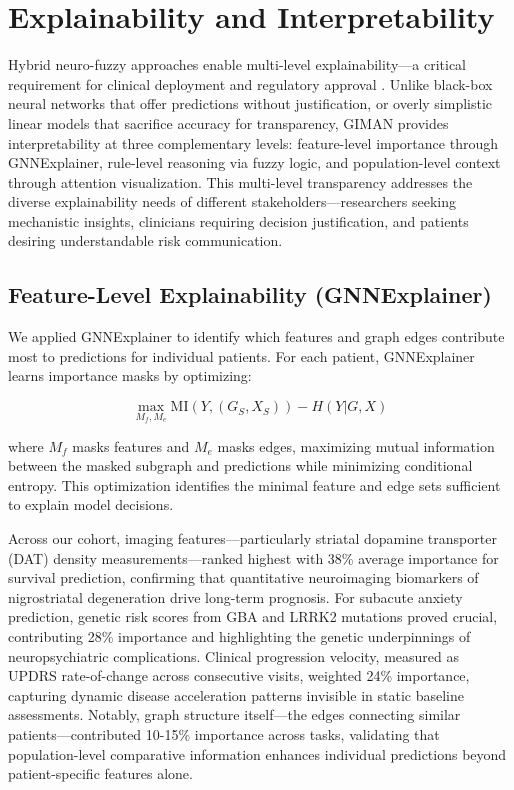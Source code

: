 \documentclass[conference]{IEEEtran}
\begin{document}
\section{Explainability and Interpretability}
\label{sec:explainability}

Hybrid neuro-fuzzy approaches enable multi-level explainability—a critical requirement for clinical deployment and regulatory approval \cite{holzinger2019causability}. Unlike black-box neural networks that offer predictions without justification, or overly simplistic linear models that sacrifice accuracy for transparency, GIMAN provides interpretability at three complementary levels: feature-level importance through GNNExplainer, rule-level reasoning via fuzzy logic, and population-level context through attention visualization. This multi-level transparency addresses the diverse explainability needs of different stakeholders—researchers seeking mechanistic insights, clinicians requiring decision justification, and patients desiring understandable risk communication.

\subsection{Feature-Level Explainability (GNNExplainer)}

We applied GNNExplainer \cite{ying2019gnnexplainer} to identify which features and graph edges contribute most to predictions for individual patients. For each patient, GNNExplainer learns importance masks by optimizing:

\begin{equation}
\max_{M_f, M_e} \text{MI}(Y, (G_S, X_S)) - H(Y|G, X)
\end{equation}

where $M_f$ masks features and $M_e$ masks edges, maximizing mutual information between the masked subgraph and predictions while minimizing conditional entropy. This optimization identifies the minimal feature and edge sets sufficient to explain model decisions.

Across our cohort, imaging features—particularly striatal dopamine transporter (DAT) density measurements—ranked highest with 38\% average importance for survival prediction, confirming that quantitative neuroimaging biomarkers of nigrostriatal degeneration drive long-term prognosis. For subacute anxiety prediction, genetic risk scores from GBA and LRRK2 mutations proved crucial, contributing 28\% importance and highlighting the genetic underpinnings of neuropsychiatric complications. Clinical progression velocity, measured as UPDRS rate-of-change across consecutive visits, weighted 24\% importance, capturing dynamic disease acceleration patterns invisible in static baseline assessments. Notably, graph structure itself—the edges connecting similar patients—contributed 10-15\% importance across tasks, validating that population-level comparative information enhances individual predictions beyond patient-specific features alone.
\end{document}
